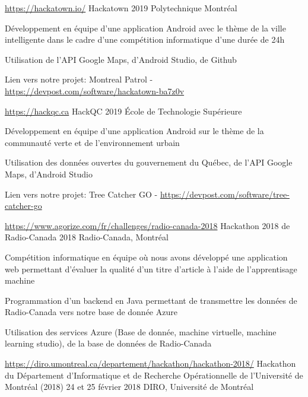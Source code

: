\begin{cventries}
  \cventry
  {\url{https://hackatown.io/}}
    {Hackatown}
    {2019}
    {Polytechnique Montréal}
    {
      \begin{cvitems}
      \item {Développement en équipe d'une application Android avec le thème de la ville intelligente dans le cadre d'une compétition informatique d'une durée de 24h}
      \item{Utilisation de l'API Google Maps, d'Android Studio, de Github}
        \item {Lien vers notre projet: Montreal Patrol - \url{https://devpost.com/software/hackatown-ba7z0v}}
      \end{cvitems}
    }
  \cventry
  {\url{https://hackqc.ca}}
    {HackQC}
    {2019}
    {École de Technologie Supérieure}
    {
      \begin{cvitems}
      \item{Développement en équipe d'une application Android sur le thème de la communauté verte et de l'environnement urbain}
      \item{Utilisation des données ouvertes du gouvernement du Québec, de l'API Google Maps, d'Android Studio} 
        \item{Lien vers notre projet: Tree Catcher GO - \url{https://devpost.com/software/tree-catcher-go}}
      \end{cvitems}
    }
  \cventry
  {\url{https://www.agorize.com/fr/challenges/radio-canada-2018}}
  {Hackathon 2018 de Radio-Canada}
    {2018}
    {Radio-Canada, Montréal}
    {
      \begin{cvitems}
      \item{Compétition informatique en équipe où nous avons développé une application web permettant d'évaluer la qualité d'un titre d'article à l'aide de l'apprentisage machine}
      \item{Programmation d'un backend en Java permettant de transmettre les données de Radio-Canada vers notre base de donnée Azure}
      \item{Utilisation des services Azure (Base de donnée, machine virtuelle, machine learning studio), de la base de données de Radio-Canada}
      \end{cvitems}
    }
    \cventry
  {\url{https://diro.umontreal.ca/departement/hackathon/hackathon-2018/}}
  {Hackathon du Département d'Informatique et de Recherche Opérationnelle de l'Université de Montréal (2018)}
    {24 et 25 février 2018}
    {DIRO, Université de Montréal}

\end{cventries}
